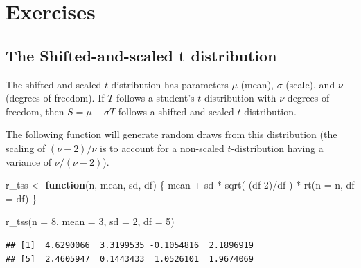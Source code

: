 \documentclass[
]{book}
\newenvironment{Shaded}{\begin{snugshade}}{\end{snugshade}}
\newcommand{\AttributeTok}[1]{\textcolor[rgb]{0.77,0.63,0.00}{#1}}
\newcommand{\ControlFlowTok}[1]{\textcolor[rgb]{0.13,0.29,0.53}{\textbf{#1}}}
\newcommand{\DecValTok}[1]{\textcolor[rgb]{0.00,0.00,0.81}{#1}}
\newcommand{\FunctionTok}[1]{\textcolor[rgb]{0.00,0.00,0.00}{#1}}
\newcommand{\NormalTok}[1]{#1}
\newcommand{\OtherTok}[1]{\textcolor[rgb]{0.56,0.35,0.01}{#1}}
\newcommand{\SpecialCharTok}[1]{\textcolor[rgb]{0.00,0.00,0.00}{#1}}
\begin{document}
\hypertarget{exercises}{%
\section{Exercises}\label{exercises}}

\hypertarget{ex_dgp}{%
\subsection{The Shifted-and-scaled t distribution}\label{ex_dgp}}

The shifted-and-scaled \(t\)-distribution has parameters \(\mu\) (mean), \(\sigma\) (scale), and \(\nu\) (degrees of freedom).
If \(T\) follows a student's \(t\)-distribution with \(\nu\) degrees of freedom, then \(S = \mu + \sigma T\) follows a shifted-and-scaled \(t\)-distribution.

The following function will generate random draws from this distribution (the scaling of \((\nu-2)/\nu\) is to account for a non-scaled \(t\)-distribution having a variance of \(\nu/(\nu-2)\)).

\begin{Shaded}
\begin{Highlighting}[]
\NormalTok{r\_tss }\OtherTok{\textless{}{-}} \ControlFlowTok{function}\NormalTok{(n, mean, sd, df) \{}
\NormalTok{  mean }\SpecialCharTok{+}\NormalTok{ sd }\SpecialCharTok{*} \FunctionTok{sqrt}\NormalTok{( (df}\DecValTok{{-}2}\NormalTok{)}\SpecialCharTok{/}\NormalTok{df ) }\SpecialCharTok{*} \FunctionTok{rt}\NormalTok{(}\AttributeTok{n =}\NormalTok{ n, }\AttributeTok{df =}\NormalTok{ df)}
\NormalTok{\}}

\FunctionTok{r\_tss}\NormalTok{(}\AttributeTok{n =} \DecValTok{8}\NormalTok{, }\AttributeTok{mean =} \DecValTok{3}\NormalTok{, }\AttributeTok{sd =} \DecValTok{2}\NormalTok{, }\AttributeTok{df =} \DecValTok{5}\NormalTok{)}
\end{Highlighting}
\end{Shaded}

\begin{verbatim}
## [1]  4.6290066  3.3199535 -0.1054816  2.1896919
## [5]  2.4605947  0.1443433  1.0526101  1.9674069
\end{verbatim}
\end{document}
